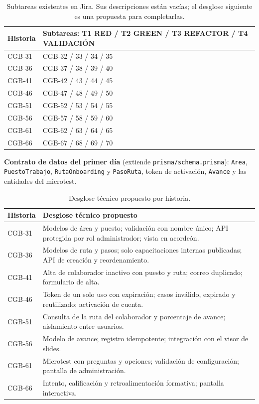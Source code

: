 \documentclass[11pt,a4paper]{article}
\begin{document}
\begin{table}[H]
\centering
\small
\begin{tabularx}{\textwidth}{l X}
\toprule
\textbf{Historia} & \textbf{Subtareas: T1 RED / T2 GREEN / T3 REFACTOR / T4 VALIDACIÓN} \\
\midrule
CGB-31 & CGB-32 / 33 / 34 / 35 \\
CGB-36 & CGB-37 / 38 / 39 / 40 \\
CGB-41 & CGB-42 / 43 / 44 / 45 \\
CGB-46 & CGB-47 / 48 / 49 / 50 \\
CGB-51 & CGB-52 / 53 / 54 / 55 \\
CGB-56 & CGB-57 / 58 / 59 / 60 \\
CGB-61 & CGB-62 / 63 / 64 / 65 \\
CGB-66 & CGB-67 / 68 / 69 / 70 \\
\bottomrule
\end{tabularx}
\caption{Subtareas existentes en Jira. Sus descripciones están vacías; el desglose siguiente es una propuesta para completarlas.}
\end{table}

\textbf{Contrato de datos del primer día} (extiende \texttt{prisma/schema.prisma}): \texttt{Area}, \texttt{PuestoTrabajo}, \texttt{RutaOnboarding} y \texttt{PasoRuta}, token de activación, \texttt{Avance} y las entidades del microtest.

\begin{table}[H]
\centering
\small
\begin{tabularx}{\textwidth}{l X}
\toprule
\textbf{Historia} & \textbf{Desglose técnico propuesto} \\
\midrule
CGB-31 & Modelos de área y puesto; validación con nombre único; API protegida por rol administrador; vista en acordeón. \\
CGB-36 & Modelos de ruta y pasos; solo capacitaciones internas publicadas; API de creación y reordenamiento. \\
CGB-41 & Alta de colaborador inactivo con puesto y ruta; correo duplicado; formulario de alta. \\
CGB-46 & Token de un solo uso con expiración; casos inválido, expirado y reutilizado; activación de cuenta. \\
CGB-51 & Consulta de la ruta del colaborador y porcentaje de avance; aislamiento entre usuarios. \\
CGB-56 & Modelo de avance; registro idempotente; integración con el visor de slides. \\
CGB-61 & Microtest con preguntas y opciones; validación de configuración; pantalla de administración. \\
CGB-66 & Intento, calificación y retroalimentación formativa; pantalla interactiva. \\
\bottomrule
\end{tabularx}
\caption{Desglose técnico propuesto por historia.}
\end{table}
\end{document}
